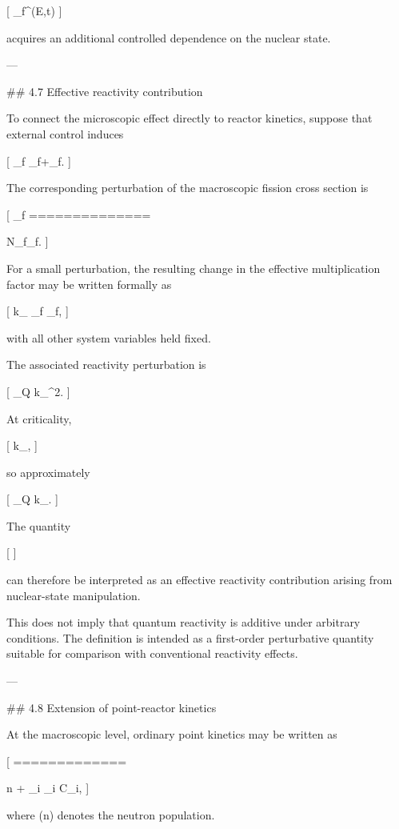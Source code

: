 [
\sigma_f^{}(E,t)
]

acquires an additional controlled dependence on the nuclear state.

---

## 4.7 Effective reactivity contribution

To connect the microscopic effect directly to reactor kinetics, suppose that external control induces

[
\sigma_f
\rightarrow
\sigma_f+\delta\sigma_f.
]

The corresponding perturbation of the macroscopic fission cross section is

[
\delta\Sigma_f
==============

N_f\delta\sigma_f.
]

For a small perturbation, the resulting change in the effective multiplication factor may be written formally as

[
\delta k_{}
\simeq
{}
{\partial\Sigma_f}
\delta\Sigma_f,
]

with all other system variables held fixed.

The associated reactivity perturbation is

[
\delta\rho_Q
\simeq
{}
{k_{}^2}.
]

At criticality,

[
k_{},
]

so approximately

[
\delta\rho_Q
\simeq
\delta k_{}.
]

The quantity

[
]

can therefore be interpreted as an effective reactivity contribution arising from nuclear-state manipulation.

This does not imply that quantum reactivity is additive under arbitrary conditions. The definition is intended as a first-order perturbative quantity suitable for comparison with conventional reactivity effects.

---

## 4.8 Extension of point-reactor kinetics

At the macroscopic level, ordinary point kinetics may be written as

[
=============

\frac{\rho-\beta}{\Lambda}n
+
\sum_i \lambda_i C_i,
]

where (n) denotes the neutron population.

